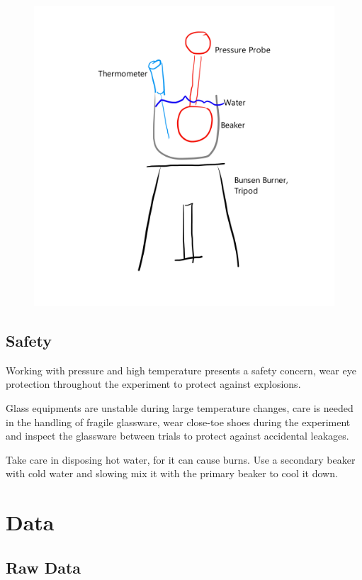 \documentclass[a4paper,12pt]{article}
\begin{document}
\begin{figure}[H]
\begin{minipage}{.6\textwidth}
        \includegraphics[scale=0.55]{assets/setupdrawn.png}
        \label{fig:setupdrawn}
    \end{minipage}
\end{figure}

\subsection{Safety}
Working with pressure and high temperature presents a safety concern, wear eye protection throughout the experiment to protect against explosions.

Glass equipments are unstable during large temperature changes, care is needed in the handling of fragile glassware, wear close-toe shoes during the experiment and inspect the glassware between trials to protect against accidental leakages.

Take care in disposing hot water, for it can cause burns. Use a secondary beaker with cold water and slowing mix it with the primary beaker to cool it down.

\section{Data}
\subsection{Raw Data}
\end{document}

